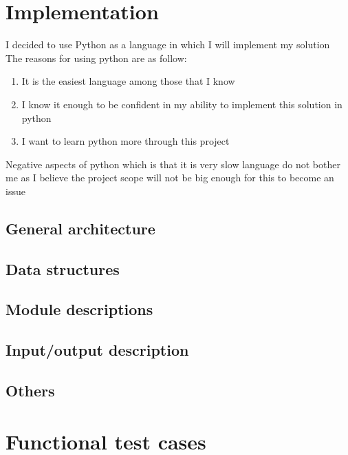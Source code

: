 \documentclass[12pt]{article}
\begin{document}
\section{Implementation}
I decided to use Python as a language in which I will implement my solution \\ 
The reasons for using python are as follow:
\begin{enumerate}
    \item It is the easiest language among those that I know
    \item I know it enough to be confident in my ability to implement this solution in python
    \item I want to learn python more through this project
\end{enumerate}
Negative aspects of python which is that it is very slow language do not bother me as I believe the project scope will not be big enough for this to become an issue
  
\subsection{General architecture}
\subsection{Data structures}
\subsection{Module descriptions}
\subsection{Input/output description}
\subsection{Others}
\section{Functional test cases}
\end{document}
